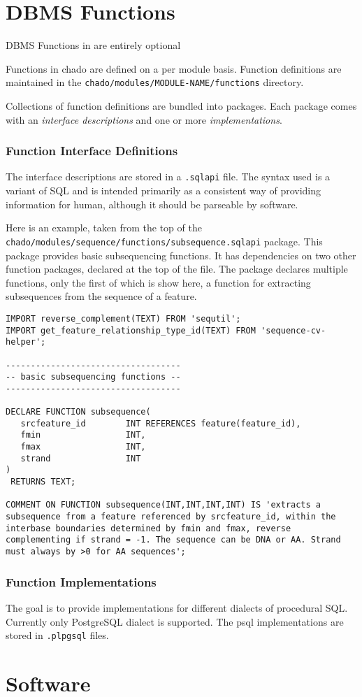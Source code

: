 \section{DBMS Functions}

DBMS Functions in \Chado are entirely optional

Functions in chado are defined on a per module basis. Function definitions are
maintained in the {\tt chado/modules/MODULE-NAME/functions} directory.

Collections of function definitions are bundled into packages. Each
package comes with an {\em interface descriptions} and one or more
{\em implementations}.

\subsubsection{Function Interface Definitions}

The interface descriptions are stored in a {\tt .sqlapi} file. The
syntax used is a variant of SQL and is intended primarily as a
consistent way of providing information for human, although it should
be parseable by software.

Here is an example, taken from the top of the {\tt
chado/modules/sequence/functions/subsequence.sqlapi} package. This
package provides basic subsequencing functions. It has dependencies on
two other function packages, declared at the top of the file. The
package declares multiple functions, only the first of which is show
here, a function for extracting subsequences from the sequence of a
feature.

\begin{verbatim}
IMPORT reverse_complement(TEXT) FROM 'sequtil';
IMPORT get_feature_relationship_type_id(TEXT) FROM 'sequence-cv-helper';

-----------------------------------
-- basic subsequencing functions --
-----------------------------------

DECLARE FUNCTION subsequence(
   srcfeature_id        INT REFERENCES feature(feature_id),
   fmin                 INT,
   fmax                 INT,
   strand               INT
)
 RETURNS TEXT;

COMMENT ON FUNCTION subsequence(INT,INT,INT,INT) IS 'extracts a
subsequence from a feature referenced by srcfeature_id, within the
interbase boundaries determined by fmin and fmax, reverse
complementing if strand = -1. The sequence can be DNA or AA. Strand
must always by >0 for AA sequences';
\end{verbatim}


\subsubsection{Function Implementations}

The goal is to provide implementations for different dialects of
procedural SQL. Currently only PostgreSQL dialect is supported. The
psql implementations are stored in {\tt .plpgsql} files.




\section{Software}
